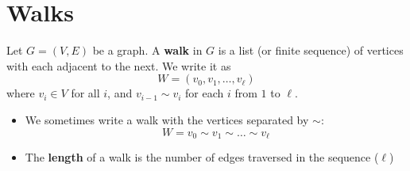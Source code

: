 \documentclass[ignorenonframetext,aspectratio=169]{beamer}
\let\defined\textbf
\begin{document}

\tableofcontents


\section{Walks}

\begin{frame}[label=walk-def]
\begin{definition}
    Let $G=(V,E)$ be a graph.
    A \defined{walk} in $G$ is a list (or finite sequence) of vertices
    with each adjacent to the next.  We write it as
    \[
        W = (v_0,v_1,\dots,v_\ell)
    \]
    where $v_i \in V$ for all $i$, and $v_{i-1} \sim v_i$ for each $i$ from $1$ to $\ell$.
\end{definition}
\begin{itemize}
\item We sometimes write a walk with the vertices separated by $\sim$:
\[
    W = v_0 \sim v_1 \sim \dots \sim v_\ell
\]
\item The \defined{length} of a walk is the number of edges traversed in the sequence
($\ell$)
\end{itemize}
\end{frame}
\end{document}
